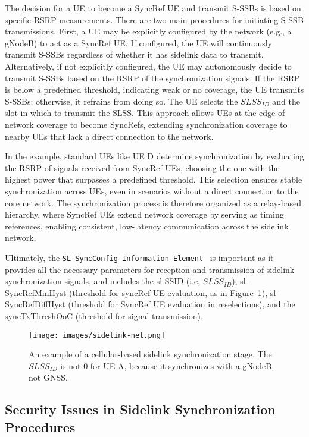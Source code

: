 The decision for a UE to become a SyncRef UE and transmit S-SSBs is based on specific RSRP measurements. There are two main procedures for initiating S-SSB transmissions. First, a UE may be explicitly configured by the network (e.g., a gNodeB) to act as a SyncRef UE. If configured, the UE will continuously transmit S-SSBs regardless of whether it has sidelink data to transmit. Alternatively, if not explicitly configured, the UE may autonomously decide to transmit S-SSBs based on the RSRP of the synchronization signals. If the RSRP is below a predefined threshold, indicating weak or no coverage, the UE transmits S-SSBs; otherwise, it refrains from doing so. The UE selects the $SLSS_{ID}$ and the slot in which to transmit the SLSS. This approach allows UEs at the edge of network coverage to become SyncRefs, extending synchronization coverage to nearby UEs that lack a direct connection to the network.

In the example, standard UEs like UE D determine synchronization by evaluating the RSRP of signals received from SyncRef UEs, choosing the one with the highest power that surpasses a predefined threshold. This selection ensures stable synchronization across UEs, even in scenarios without a direct connection to the core network. The synchronization process is therefore organized as a relay-based hierarchy, where SyncRef UEs extend network coverage by serving as timing references, enabling consistent, low-latency communication across the sidelink network. 

Ultimately, the \texttt{SL-SyncConfig Information Element}~\cite{3gpp.38.331} is important as it provides all the necessary parameters for reception and transmission of sidelink synchronization signals, and includes the sl-SSID (i.e, $SLSS_{ID}$), sl-SyncRefMinHyst (threshold for syncRef UE evaluation, as in Figure~\ref{fig:sidelink-net}), sl-SyncRefDiffHyst (threshold for SyncRef UE evaluation in reselections), and the syncTxThreshOoC (threshold for signal transmission).

\begin{figure}[!t]
     \centering
     \texttt{[image: images/sidelink-net.png]}
     \caption{An example of a cellular-based sidelink synchronization stage. The $SLSS_{ID}$ is not 0 for UE A, because it synchronizes with a gNodeB, not GNSS.}
     \label{fig:sidelink-net}
\end{figure}

\subsection{Security Issues in Sidelink Synchronization Procedures}

